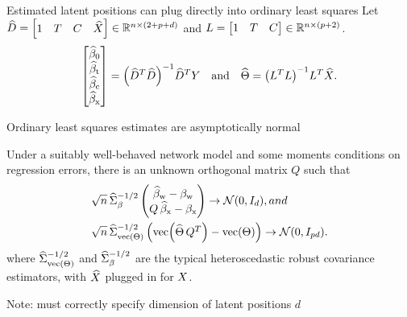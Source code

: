 \documentclass[aspectratio=169]{beamer}
\theoremstyle{remark}
\begin{document}
\begin{frame}{Estimated latent positions can plug directly into ordinary least squares}
    Let $\widehat{D} = \begin{bmatrix} 1 & T & C  & \widehat{X} \end{bmatrix} \in \mathbb{R}^{n \times (2 + p + d)}$ and $L = \begin{bmatrix} 1 & T & C \end{bmatrix} \in \mathbb{R}^{n \times (p + 2)}$.
    \begin{equation*}
        \begin{bmatrix}
            \betazerohat \\
            \betathat    \\
            \betachat    \\
            \betaxhat
        \end{bmatrix}
        = \paren*{\Dhat^T \Dhat}^{-1} \Dhat^T Y
        \quad \text{and} \quad
        \Thetahat
        = \paren*{\Wfull^T \Wfull}^{-1} \Wfull^T \Xhat.
    \end{equation*}
\end{frame}

\begin{frame}{Ordinary least squares estimates are asymptotically normal}
    \begin{theorem}[]
        Under a suitably well-behaved network model and some moments conditions on regression errors, there is an unknown orthogonal matrix $Q$ such that
        \begin{equation*}
            \begin{aligned}
                \sqrt{ n } \,
                 & \Sigmahatbeta^{-1/2}
                \begin{pmatrix}
                    \betawhat - \betaw \\
                    Q \, \betaxhat - \betax
                \end{pmatrix}
                \to
                \Normal{0}{I_d}, and     \\
                \sqrt{ n } \,
                 & \Sigmahattheta^{-1/2}
                \begin{pmatrix}
                    \vecc \paren*{\Thetahat \, Q^T} - \Thetavec
                \end{pmatrix}
                \to
                \Normal{0}{I_{p d}}.
            \end{aligned}
        \end{equation*}
        \noindent where $\widehat{\Sigma}_{\operatorname*{vec} \left(\Theta\right)}^{-1/2}$ and $\widehat{\Sigma}_\beta^{-1/2}$ are the typical heteroscedastic robust covariance estimators, with $\widehat{X}$ plugged in for $X$.
    \end{theorem}

    \centering
    Note: must correctly specify dimension of latent positions $d$
\end{frame}
\end{document}
